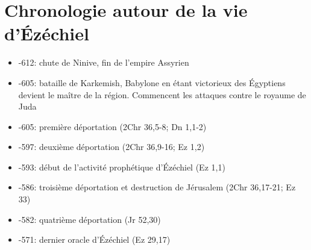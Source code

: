 \section*{Chronologie autour de la vie d'Ézéchiel}
\begin{itemize}[label=] 
\item -612: chute de Ninive, fin de l'empire Assyrien
\item -605: bataille de Karkemish, Babylone en étant victorieux des Égyptiens devient le maître de la région. Commencent les attaques contre le royaume de Juda
\item -605: première déportation (2Chr 36,5-8; Dn 1,1-2)
\item -597: deuxième déportation (2Chr 36,9-16; Ez 1,2)
\item -593: début de l'activité prophétique d'Ézéchiel (Ez 1,1)
\item -586: troisième déportation et destruction de Jérusalem (2Chr 36,17-21; Ez 33)
\item -582: quatrième déportation (Jr 52,30)
\item -571: dernier oracle d'Ézéchiel (Ez 29,17)
\end{itemize}
